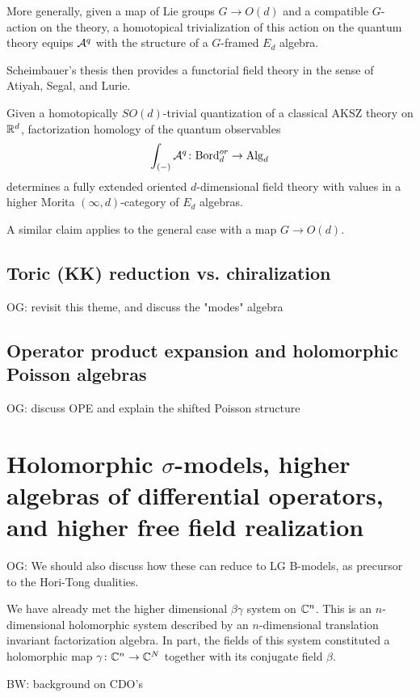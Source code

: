 \documentclass[11pt]{amsart}
\def\brian#1{{\textcolor{blue!65!red}{BW: {#1}}}}
\def\owen#1{{\textcolor{violet!65!black}{OG: {#1}}}}
\begin{document}
More generally, given a map of Lie groups $G \to O(d)$ and a compatible $G$-action on the theory, a homotopical trivialization of this action on the quantum theory equips $\mathcal A^q$ with the structure of a $G$-framed $E_d$ algebra.

Scheimbauer's thesis then provides a functorial field theory in the sense of Atiyah, Segal, and Lurie.

\begin{thm}
Given a homotopically $SO(d)$-trivial quantization of a classical AKSZ theory on $\mathbb R^d$, 
factorization homology of the quantum observables 
\[
\int_{(-)} \mathcal A^q \colon {\rm Bord}^{or}_d \to {\rm Alg}_d
\]
determines a fully extended oriented $d$-dimensional field theory with values in a higher Morita $(\infty,d)$-category of $E_d$ algebras.
\end{thm}

A similar claim applies to the general case with a map $G \to O(d)$.

\subsection{Toric (KK) reduction vs. chiralization}

\owen{revisit this theme, and discuss the "modes" algebra}

\subsection{Operator product expansion and holomorphic Poisson algebras}

\owen{discuss OPE and explain the shifted Poisson structure}

\section{Holomorphic $\sigma$-models, higher algebras of differential operators, and higher free field realization}

\owen{We should also discuss how these can reduce to LG B-models, as precursor to the Hori-Tong dualities.}

We have already met the higher dimensional $\beta\gamma$ system on $\mathbb C^n$.
This is an $n$-dimensional holomorphic system described by an $n$-dimensional translation invariant factorization algebra.
In part, the fields of this system constituted a holomorphic map $\gamma \colon \mathbb C^n \to \mathbb C^N$ together with its conjugate field $\beta$. 

\brian{background on CDO's}
\end{document}
